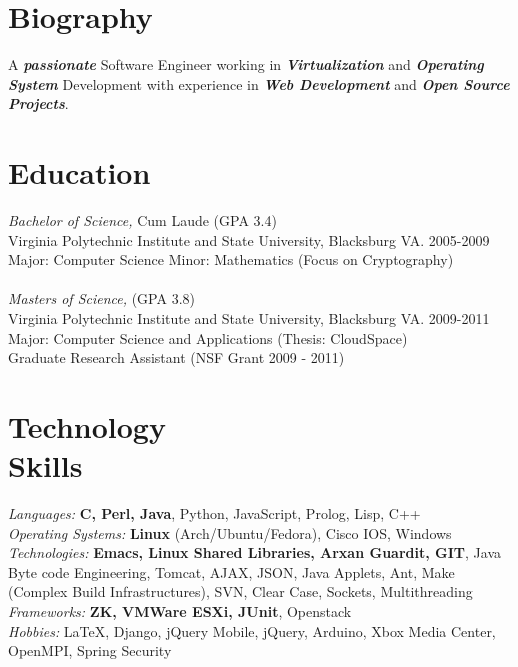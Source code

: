 \documentclass[line,margin]{res}
\begin{document}
\address{2132 Sterling Green Dr, Morrisville, NC 27560}
\address{Email: vtwoods@gmail.com --- Cell: (703)475-1337}

 
\begin{resume}
 
\section{Biography} A \textbf{\emph{passionate}} Software Engineer working in \textbf{\emph{Virtualization}} and \textbf{\emph{Operating System}} Development with experience in \textbf{\emph{Web Development}} and \textbf{\emph{Open Source Projects}}. 
 
 
\section{Education} {\sl Bachelor of Science,} Cum Laude (GPA 3.4) \\
                Virginia Polytechnic Institute and State University, Blacksburg VA. 2005-2009 \\
                Major: Computer Science Minor: Mathematics (Focus on Cryptography)\\
\\[-5pt]
                {\sl Masters of Science,} (GPA 3.8) \\
                Virginia Polytechnic Institute and State University, Blacksburg VA. 2009-2011 \\
                Major: Computer Science and Applications (Thesis:  CloudSpace) \\
                Graduate Research Assistant (NSF Grant 2009 - 2011)
 
\section{Technology \\ Skills} {\sl Languages:} \textbf{C, Perl, Java}, Python, JavaScript, Prolog, Lisp, C++ \\
                {\sl Operating Systems:} \textbf{Linux} (Arch/Ubuntu/Fedora), Cisco IOS, Windows \\
                {\sl Technologies:} \textbf{Emacs, Linux Shared Libraries, Arxan Guardit, GIT}, Java Byte code Engineering, Tomcat, AJAX, JSON, Java Applets, Ant, Make (Complex Build Infrastructures), SVN, Clear Case, Sockets, Multithreading \\
                {\sl Frameworks:} \textbf{ZK, VMWare ESXi, JUnit}, Openstack \\
                {\sl Hobbies:} \LaTeX, Django, jQuery Mobile, jQuery, Arduino, Xbox Media Center, OpenMPI, Spring Security
 

\end{resume}
\end{document}
